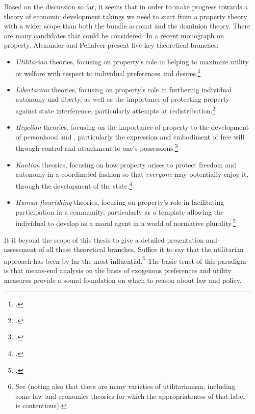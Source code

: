 Based on the discussion so far, it seems that in order to make progress towards a theory of economic development takings we need to start from a property theory with a wider scope than both the bundle account and the dominion theory. There are many candidates that could be considered. In a recent monograph on property, Alexander and Pe\~{n}alver present five key theoretical branches:
\begin{itemize}
\item {\it Utilitarian} theories, focusing on property's role in helping to maximize utility or welfare with respect to individual preferences and desires.\footnote{\cite[Chapter 1]{alexander10}.} 
\item {\it Libertarian} theories, focusing on property's role in furthering individual autonomy and liberty, as well as the importance of protecting property against state interference, particularly attempts at redistribution.\footnote{\cite[Chapter 2]{alexander10}.} 
\item {\it Hegelian} theories, focusing on the importance of property to the development of personhood and , particularly the expression and embodiment of free will through control and attachment to one's possessions.\footnote{\cite[Chapter 3]{alexander10}.}
\item {\it Kantian} theories, focusing on how property arises to protect freedom and autonomy in a coordinated fashion so that {\it everyone} may potentially enjoy it, through the development of the state.\footnote{\cite[Chapter 4]{alexander10}.}
\item {\it  Human flourishing} theories, focusing on property's role in facilitating participation in a community, particularly as a template allowing the individual to develop as a moral agent in a world of normative plurality.\footnote{\cite[Chapter 5]{alexander10}.}
\end{itemize}

It it beyond the scope of this thesis to give a detailed presentation and assessment of all these theoretical branches. Suffice it to say that the utilitarian approach has been by far the most influential.\footnote{See \cite[11]{alexander12} (noting also that there are many varieties of utilitarianism, including some law-and-economics theories for which the appropriateness of that label is contentious).} The basic tenet of this paradigm is that means-end analysis on the basis of exogenous preferences and utility measures provide a sound foundation on which to reason about law and policy.

